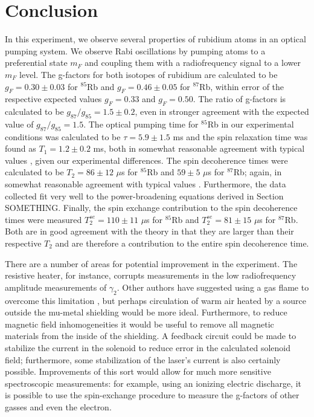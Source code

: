 
\section{Conclusion}\label{conclusion}

In this experiment, we observe several properties of rubidium atoms in an optical pumping system. We observe Rabi oscillations by pumping atoms to a preferential state $m_{F}$ and coupling them with a radiofrequency signal to a lower $m_{F}$ level. The g-factors for both isotopes of rubidium are calculated to be $g_{F}=0.30\pm0.03$ for $^{85}$Rb and $g_{F}=0.46\pm0.05$ for $^{87}$Rb, within error of the respective expected values $g_{F}=0.33$ and $g_{F}=0.50$. The ratio of g-factors is calculated to be $g_{87}/g_{85}=1.5\pm0.2$, even in stronger agreement with the expected value of $g_{87}/g_{85}=1.5$. The optical pumping time for $^{85}$Rb in our experimental conditions was calculated to be $\tau = 5.9\pm 1.5$ ms and the spin relaxation time was found as $T_{1}=1.2 \pm 0.2$ ms, both in somewhat reasonable agreement with typical values \cite{vanier}, given our experimental differences. The spin decoherence times were calculated to be $T_2 = 86 \pm 12$ $\mu$s for $^{85}$Rb and $59 \pm 5$ $\mu$s for $^{87}$Rb; again, in somewhat reasonable agreement with typical values \cite{vanier}. Furthermore, the data collected fit very well to the power-broadening equations derived in Section SOMETHING. Finally, the spin exchange contribution to the spin decoherence times were measured $T^{se}_2=110 \pm 11$ $\mu$s for  $^{85}$Rb and $T^{se}_2 = 81 \pm 15$ $\mu$s for  $^{87}$Rb. Both are in good agreement with the theory in that they are larger than their respective $T_{2}$ and are therefore a contribution to the entire spin decoherence time. 

There are a number of areas for potential improvement in the experiment. The resistive heater, for instance, corrupts measurements in the low radiofrequency amplitude measurements of $\gamma_{2}$. Other authors have suggested using a gas flame to overcome this limitation \cite{benumof}, but perhaps circulation of warm air heated by a source outside the mu-metal shielding would be more ideal. Furthermore, to reduce magnetic field inhomogeneities it would be useful to remove all magnetic materials from the inside of the shielding. A feedback circuit could be made to stabilize the current in the solenoid to reduce error in the calculated solenoid field; furthermore, some stabilization of the laser's current is also certainly possible. Improvements of this sort would allow for much more sensitive spectroscopic measurements: for example, using an ionizing electric discharge, it is possible to use the spin-exchange procedure to measure the g-factors of other gasses and even the electron.